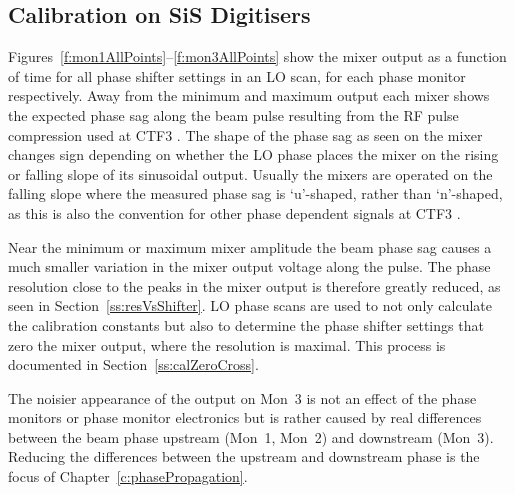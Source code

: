 \subsection{Calibration on SiS Digitisers}
\label{ss:SiSCal}

Figures~\ref{f:mon1AllPoints}--\ref{f:mon3AllPoints} show the mixer output as a function of time for all phase shifter settings in an LO scan, for each phase monitor respectively. Away from the minimum and maximum output each mixer shows the expected phase sag along the beam pulse resulting from the RF pulse compression used at CTF3 \cite{rfCompress}. The shape of the phase sag as seen on the mixer changes sign depending on whether the LO phase places the mixer on the rising or falling slope of its sinusoidal output. Usually the mixers are operated on the falling slope where the measured phase sag is `u'-shaped, rather than `n'-shaped, as this is also the convention for other phase dependent signals at CTF3 \cite{piotrPriv}.

Near the minimum or maximum mixer amplitude the beam phase sag causes a much smaller variation in the mixer output voltage along the pulse. The phase resolution close to the peaks in the mixer output is therefore greatly reduced, as seen in Section~\ref{ss:resVsShifter}. LO phase scans are used to not only calculate the calibration constants but also to determine the phase shifter settings that zero the mixer output, where the resolution is maximal. This process is documented in Section~\ref{ss:calZeroCross}.

The noisier appearance of the output on Mon~3 is not an effect of the phase monitors or phase monitor electronics but is rather caused by real differences between the beam phase upstream (Mon~1, Mon~2) and downstream (Mon~3). Reducing the differences between the upstream and downstream phase is the focus of Chapter~\ref{c:phasePropagation}.

